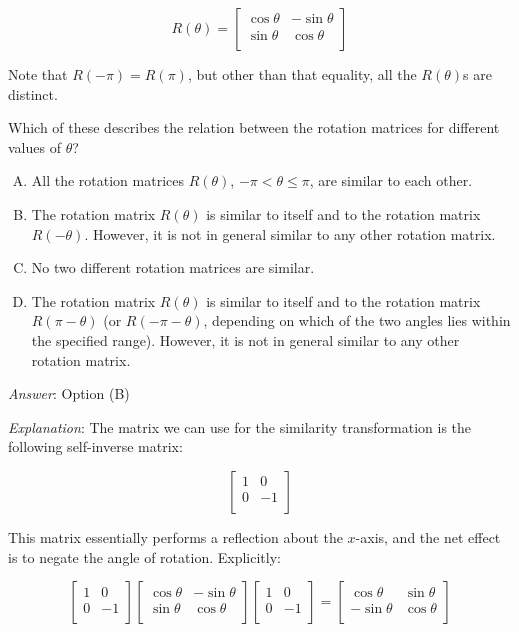 \documentclass[10pt]{amsart}
\begin{document}
\begin{enumerate}
  $$R(\theta) = \left[\begin{matrix} \cos \theta & -\sin \theta \\ \sin \theta & \cos \theta \\\end{matrix}\right]$$

  Note that $R(-\pi) = R(\pi)$, but other than that equality, all the
  $R(\theta)$s are distinct.

  Which of these describes the relation between the rotation matrices
  for different values of $\theta$?

  \begin{enumerate}[(A)]
  \item All the rotation matrices $R(\theta)$, $-\pi < \theta \le
    \pi$, are similar to each other.
  \item The rotation matrix $R(\theta)$ is similar to itself and to
    the rotation matrix $R(-\theta)$. However, it is not in general
    similar to any other rotation matrix.
  \item No two different rotation matrices are similar.
  \item The rotation matrix $R(\theta)$ is similar to itself and to
    the rotation matrix $R(\pi -\theta)$ (or $R(-\pi - \theta)$,
    depending on which of the two angles lies within the specified
    range). However, it is not in general similar to any other
    rotation matrix.
  \end{enumerate}

  {\em Answer}: Option (B)

  {\em Explanation}: The matrix we can use for the similarity
  transformation is the following self-inverse matrix:

  $$\left[\begin{matrix} 1 & 0 \\ 0 & -1 \\\end{matrix}\right]$$

  This matrix essentially performs a reflection about the $x$-axis,
  and the net effect is to negate the angle of rotation. Explicitly:

  $$\left[\begin{matrix} 1 & 0 \\ 0 & -1 \\\end{matrix}\right]\left[\begin{matrix} \cos \theta & -\sin \theta \\ \sin \theta & \cos \theta \\\end{matrix}\right]\left[\begin{matrix} 1 & 0 \\ 0 & -1 \\\end{matrix}\right] = \left[\begin{matrix} \cos \theta & \sin \theta \\ -\sin \theta & \cos \theta \\\end{matrix}\right]$$


\end{enumerate}
\end{document}
